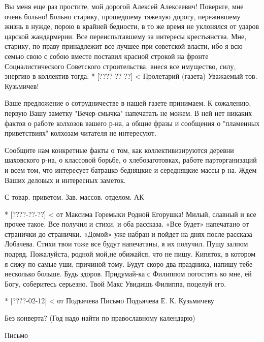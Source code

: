 Вы меня еще раз простите, мой дорогой Алексей Алексеевич! Поверьте, мне очень больно! Больно старику, прошедшему тяжелую дорогу, пережившему жизнь в нужде, порою в крайней бедности, в то же время не уклонялся от ударов царской жандармерии. Все переиспытавшему за интересы крестьянства. Мне, старику, по праву принадлежит все лучшее при советской власти, ибо я всю семью свою с собою вместе поставил красной строкой на фронте Социалистического Советского строительства, внеся все имущество, силу, энергию в коллектив тогда.
* [????-??-??] < Пролетарий (газета)
Уважаемый тов. Кузьмичев!

Ваше предложение о сотрудничестве в нашей газете принимаем. К сожалению, первую Вашу заметку "Вечер-смычка" напечатать не можем. В ней нет никаких фактов о работе колхозов вашего р-на, а общие фразы и сообщения о "пламенных приветствиях" колхозам читателя не интересуют.

Сообщите нам конкретные факты о том, как коллективизируются деревни шаховского р-на, о классовой борьбе, о хлебозаготовках, работе парторганизаций и всем том, что интересует батрацко-бедняцкие и середняцкие массы р-на.
Ждем Ваших деловых и интересных заметок.

С товар. приветом.
Зав. массов. отделом. АК

* [????-??-??] < от Максима Горемыки
                                Родной Егорушка!
Милый, славный и все прочее такое.
Все получил и стихи, и оба рассказа. «Все будет» напечатано от странички до странички. «Домой» уже набран и пойдет на днях после рассказа Лобачева. Стихи твои тоже все будут напечатаны, я их получил. Пущу залпом подряд. Пожалуйста, родной мой,не обижайся, что не пишу. Кипяток, в котором я сижу по самые уши, причиной тому. Будут скоро два праздника, напишу тебе несколько больше. Будь здоров.
   Придумай-ка с Филиппом погостить ко мне, ей Богу, соберитесь серьезно.
                    Твой Макс
Увидишь Филиппа, поцелуй его.

* [????-02-12] < от Подъячева
Письмо Подъячева Е. К. Кузьмичеву

Без конверта? (Год надо найти по православному календарю)

Письмо


